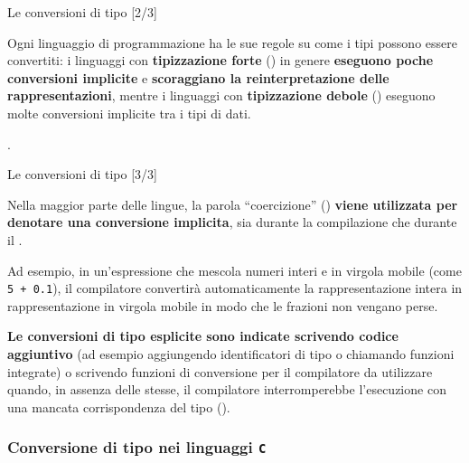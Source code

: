 \documentclass[xcolor={dvipsnames, svgnames, x11names, table}, 10pt]{beamer}
\begin{document}
\begin{frame}[t]{Le conversioni di tipo [2/3]}

Ogni linguaggio di programmazione ha le sue regole su come i tipi possono essere convertiti: \alert<1>{i linguaggi con \textbf{tipizzazione forte} () in genere \textbf{eseguono poche conversioni implicite} e \textbf{scoraggiano la reinterpretazione delle rappresentazioni}}, mentre \alert<2>{i linguaggi con \textbf{tipizzazione debole} () eseguono molte conversioni implicite tra i tipi di dati.}

.%

\end{frame}

\begin{frame}[t]{Le conversioni di tipo [3/3]}

\alert<1>{Nella maggior parte delle lingue, la parola \enquote{coercizione} (\textbf{}) \textbf{viene utilizzata per denotare una conversione implicita}, sia durante la compilazione che durante il .}
\pause

\alert<2>{Ad esempio, in un'espressione che mescola numeri interi e in virgola mobile (come \texttt{5 + 0.1}), il compilatore convertirà automaticamente la rappresentazione intera in rappresentazione in virgola mobile in modo che le frazioni non vengano perse.}
\pause

\alert<3>{\textbf{Le conversioni di tipo esplicite sono indicate scrivendo codice aggiuntivo} (ad esempio aggiungendo identificatori di tipo o chiamando funzioni integrate) o scrivendo funzioni di conversione per il compilatore da utilizzare quando, in assenza delle stesse, il compilatore interromperebbe l'esecuzione con una mancata corrispondenza del tipo ().}


\end{frame}

\subsubsection{Conversione di tipo nei linguaggi \texttt{C}}
\end{document}
